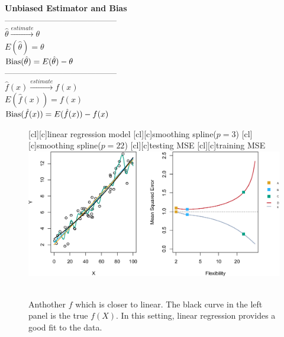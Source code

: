     \documentclass[12pt,fleqn,a4paper]{article}
\theoremstyle{definition}
\theoremstyle{plain}
\begin{document}
\begin{framed}
\textbf{Unbiased Estimator and Bias}\\
----------------------------------------- \\
$\hat{\theta}\stackrel{estimate}{\longrightarrow} \theta $ \\
$E(\hat{\theta})= \theta$ \\
${\rm Bias}(\hat{\theta}) = E(\hat{\theta}) - \theta $ \\
----------------------------------------- \\
$\hat{f}(x)\stackrel{estimate}{\longrightarrow} f(x)$\\
$E(\hat{f}(x))= f(x)$ \\
${\rm Bias}(\hat{f}(x)) = E(\hat{f}(x)) - f(x) $ \\
\end{framed}


\begin{figure}[H]
\centering
{}[cl][c]{\tiny linear regression model}
[cl][c]{\tiny smoothing spline($p=3$)}
[cl][c]{\tiny smoothing spline($p=22$)}
[cl][c]{\tiny testing MSE}
[cl][c]{\tiny training MSE}
\includegraphics[scale=0.7]{images//2_10.eps}
\\~\\
\caption{Anthother $f$ which is closer to linear. The black curve in the left panel is the true $f(X)$. In this setting, linear regression provides a good fit to the data.}\label{figure-2.10}
\end{figure}
\end{document}
